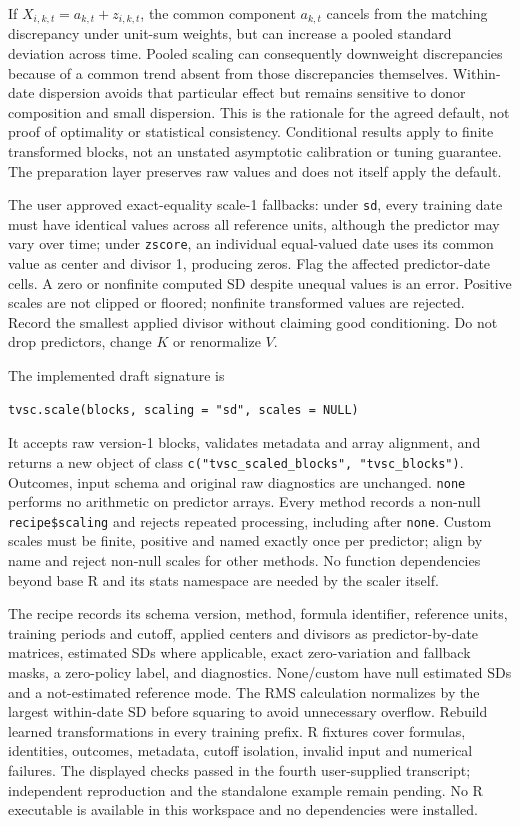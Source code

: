 \documentclass[11pt]{article}
\begin{document}
If $X_{i,k,t}=a_{k,t}+z_{i,k,t}$, the common component $a_{k,t}$ cancels
from the matching discrepancy under unit-sum weights, but can increase
a pooled standard deviation across time. Pooled scaling can consequently
downweight discrepancies because of a common trend absent from those
discrepancies themselves. Within-date dispersion avoids that particular
effect but remains sensitive to donor composition and small dispersion.
This is the rationale for the agreed default, not proof of optimality or
statistical consistency. Conditional results apply to finite transformed
blocks, not an unstated asymptotic calibration or tuning guarantee. The
preparation layer preserves raw values and does not itself apply the default.

The user approved exact-equality scale-1 fallbacks: under \texttt{sd},
every training date must have identical values across all reference units,
although the predictor may vary over time; under \texttt{zscore}, an
individual equal-valued date uses its common value as center and divisor
1, producing zeros. Flag the affected predictor-date cells. A zero or
nonfinite computed SD despite unequal values is an error. Positive scales
are not clipped or floored; nonfinite transformed values are rejected.
Record the smallest applied divisor without claiming good conditioning.
Do not drop predictors, change $K$ or renormalize $V$.

The implemented draft signature is
\begin{verbatim}
tvsc.scale(blocks, scaling = "sd", scales = NULL)
\end{verbatim}
It accepts raw version-1 blocks, validates metadata and array alignment,
and returns a new object of class
\texttt{c("tvsc\_scaled\_blocks", "tvsc\_blocks")}. Outcomes, input
schema and original raw diagnostics are unchanged. \texttt{none} performs
no arithmetic on predictor arrays. Every method records a non-null
\texttt{recipe\$scaling} and rejects repeated processing, including after
\texttt{none}. Custom scales must be finite, positive and named exactly
once per predictor; align by name and reject non-null scales for other
methods. No function dependencies beyond base R and its stats namespace
are needed by the scaler itself.

The recipe records its schema version, method, formula identifier,
reference units, training periods and cutoff, applied centers and divisors
as predictor-by-date matrices, estimated SDs where applicable, exact
zero-variation and fallback masks, a zero-policy label, and diagnostics.
None/custom have null estimated SDs and a not-estimated reference mode.
The RMS calculation normalizes by the largest within-date SD before
squaring to avoid unnecessary overflow. Rebuild learned transformations
in every training prefix. R fixtures cover formulas, identities, outcomes,
metadata, cutoff isolation, invalid input and numerical failures. The
displayed checks passed in the fourth user-supplied transcript; independent
reproduction and the standalone example remain pending. No R executable is available
in this workspace and no dependencies were installed.
\end{document}
